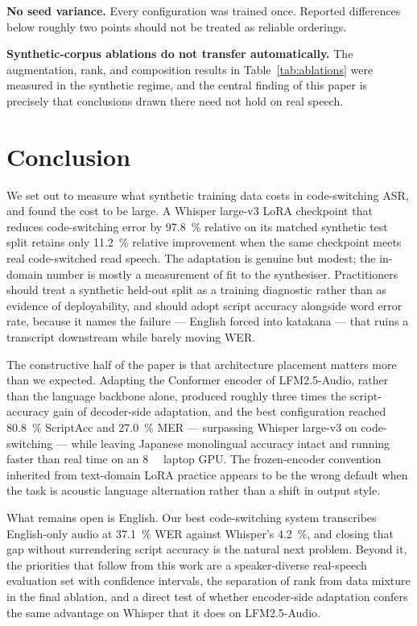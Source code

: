 \documentclass[11pt,a4paper]{article}
\begin{document}
\textbf{No seed variance.} Every configuration was trained once. Reported
differences below roughly two points should not be treated as reliable
orderings.

\textbf{Synthetic-corpus ablations do not transfer automatically.} The
augmentation, rank, and composition results in Table~\ref{tab:ablations} were
measured in the synthetic regime, and the central finding of this paper is
precisely that conclusions drawn there need not hold on real speech.

\section{Conclusion}

We set out to measure what synthetic training data costs in code-switching ASR,
and found the cost to be large. A Whisper large-v3 LoRA checkpoint that reduces
code-switching error by \SI{97.8}{\percent} relative on its matched synthetic test
split retains only \SI{11.2}{\percent} relative improvement when the same
checkpoint meets real code-switched read speech. The adaptation is genuine but
modest; the in-domain number is mostly a measurement of fit to the synthesiser.
Practitioners should treat a synthetic held-out split as a training diagnostic
rather than as evidence of deployability, and should adopt script accuracy
alongside word error rate, because it names the failure --- English forced into
katakana --- that ruins a transcript downstream while barely moving WER.

The constructive half of the paper is that architecture placement matters more
than we expected. Adapting the Conformer encoder of LFM2.5-Audio, rather than the
language backbone alone, produced roughly three times the script-accuracy gain of
decoder-side adaptation, and the best configuration reached \SI{80.8}{\percent}
ScriptAcc and \SI{27.0}{\percent} MER --- surpassing Whisper large-v3 on
code-switching --- while leaving Japanese monolingual accuracy intact and running
faster than real time on an \SI{8}{\giga\byte} laptop GPU. The frozen-encoder
convention inherited from text-domain LoRA practice appears to be the wrong
default when the task is acoustic language alternation rather than a shift in
output style.

What remains open is English. Our best code-switching system transcribes
English-only audio at \SI{37.1}{\percent} WER against Whisper's
\SI{4.2}{\percent}, and closing that gap without surrendering script accuracy is
the natural next problem. Beyond it, the priorities that follow from this work are
a speaker-diverse real-speech evaluation set with confidence intervals, the
separation of rank from data mixture in the final ablation, and a direct test of
whether encoder-side adaptation confers the same advantage on Whisper that it
does on LFM2.5-Audio.
\end{document}
